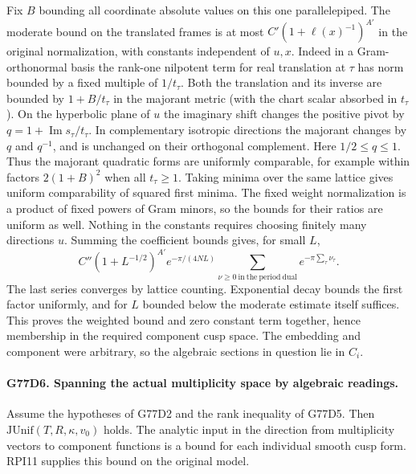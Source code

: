 Fix $B$ bounding all coordinate absolute values on this one
parallelepiped. The moderate bound on the translated frames is at
most $C'(1+\ell(x)^{-1})^{A'}$ in the original normalization,
with constants independent of $u,x$. Indeed in a Gram-orthonormal
basis the rank-one nilpotent term for real translation at $\tau$
has norm bounded by a fixed multiple of $1/t_\tau$. Both the
translation and its inverse are bounded by $1+B/t_\tau$ in the
majorant metric (with the chart scalar absorbed in $t_\tau$).
On the hyperbolic plane of $u$ the imaginary shift changes the
positive pivot by $q=1+\operatorname{Im}s_\tau/t_\tau$.
In complementary isotropic directions the majorant changes by
$q$ and $q^{-1}$, and is unchanged on their orthogonal complement.
Here $1/2\le q\le1$. Thus the majorant quadratic forms are
uniformly comparable, for example within factors
$2(1+B)^2$ when all $t_\tau\ge1$. Taking minima over the
same lattice gives uniform comparability of squared first minima.
The fixed weight normalization is a product of fixed powers
of Gram minors, so the bounds for their ratios are uniform as
well. Nothing in the constants requires choosing finitely many
directions $u$.
Summing the coefficient bounds gives, for small $L$,
\[
 C''(1+L^{-1/2})^{A'}
     e^{-\pi/(4NL)}
        \sum_{\nu\ge0\ \mathrm{in\ the\ period\ dual}}
                      e^{-\pi\sum_\tau\nu_\tau}.
\]
The last series converges by lattice counting. Exponential decay
bounds the first factor uniformly, and for $L$ bounded below the
moderate estimate itself suffices. This proves the weighted bound
and zero constant term together, hence membership in the required
component cusp space. The embedding and component were arbitrary,
so the algebraic sections in question lie in $C_i$.

\paragraph{G77D6. Spanning the actual multiplicity space by algebraic readings.}
Assume the hypotheses of G77D2 and the rank inequality of G77D5.
Then $\mathrm{JUnif}(T,R,\kappa,v_0)$ holds. The analytic input
in the direction from multiplicity vectors to component functions
is a bound for each individual smooth cusp form. RPI11 supplies
this bound on the original model.

